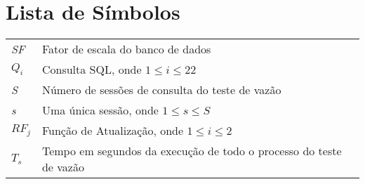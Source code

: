 \pagebreak
{}
\chapter*{Lista de Símbolos}
\begin{tabular}{ll}
	\textit{SF} & Fator de escala do banco de dados \\
	$Q_{i}$ & Consulta SQL, onde \mbox{$1 \le i \le 22$}\\
	\textit{S} & Número de sessões de consulta do teste de vazão\\
	\textit{s} & Uma única sessão, onde \mbox{$1 \le s \le S$}\\
	$RF_{j}$ & Função de Atualização, onde \mbox{$1 \le i \le 2$}\\
	$T_{s}$ & Tempo em segundos da execução de todo o processo do teste de vazão\\
\end{tabular}

\pagebreak
{}
\tableofcontents
